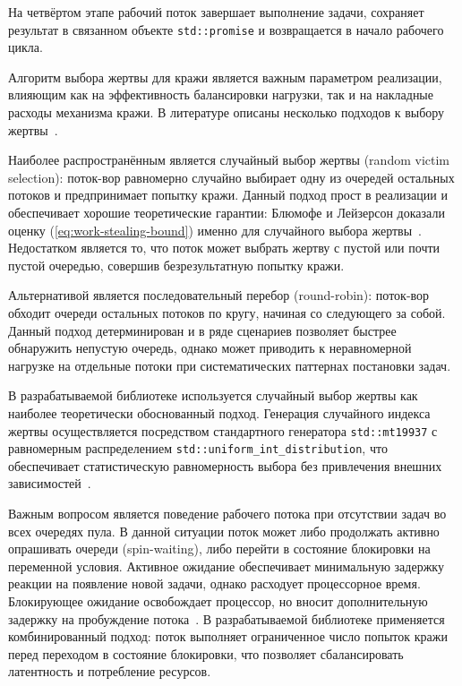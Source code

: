 На четвёртом этапе рабочий поток завершает выполнение задачи,
сохраняет результат в связанном объекте \texttt{std::promise}
и возвращается в начало рабочего цикла.

Алгоритм выбора жертвы для кражи является важным параметром
реализации, влияющим как на эффективность балансировки нагрузки,
так и на накладные расходы механизма кражи. В литературе
описаны несколько подходов к выбору жертвы~\cite{Blumofe1999,
Williams2019}.

Наиболее распространённым является случайный выбор жертвы
(random victim selection): поток-вор равномерно случайно выбирает
одну из очередей остальных потоков и предпринимает попытку кражи.
Данный подход прост в реализации и обеспечивает хорошие
теоретические гарантии: Блюмофе и Лейзерсон доказали оценку
(\ref{eq:work-stealing-bound}) именно для случайного выбора
жертвы~\cite{Blumofe1999}. Недостатком является то, что поток
может выбрать жертву с пустой или почти пустой очередью,
совершив безрезультатную попытку кражи.

Альтернативой является последовательный перебор (round-robin):
поток-вор обходит очереди остальных потоков по кругу, начиная
со следующего за собой. Данный подход детерминирован и в ряде
сценариев позволяет быстрее обнаружить непустую очередь,
однако может приводить к неравномерной нагрузке на отдельные
потоки при систематических паттернах постановки задач.

В разрабатываемой библиотеке используется случайный выбор
жертвы как наиболее теоретически обоснованный подход.
Генерация случайного индекса жертвы осуществляется посредством
стандартного генератора \texttt{std::mt19937} с равномерным
распределением \texttt{std::uniform\_int\_distribution},
что обеспечивает статистическую равномерность выбора без
привлечения внешних зависимостей~\cite{Williams2019}.

Важным вопросом является поведение рабочего потока при
отсутствии задач во всех очередях пула. В данной ситуации
поток может либо продолжать активно опрашивать очереди
(spin-waiting), либо перейти в состояние блокировки
на переменной условия. Активное ожидание обеспечивает
минимальную задержку реакции на появление новой задачи,
однако расходует процессорное время. Блокирующее ожидание
освобождает процессор, но вносит дополнительную задержку
на пробуждение потока~\cite{Williams2019}. В разрабатываемой
библиотеке применяется комбинированный подход: поток выполняет
ограниченное число попыток кражи перед переходом в состояние
блокировки, что позволяет сбалансировать латентность
и потребление ресурсов.